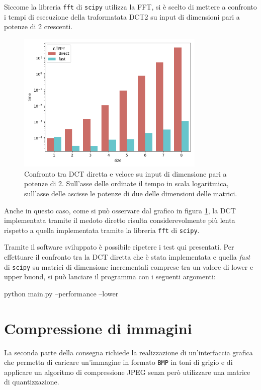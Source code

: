\documentclass[a4paper, 12pt]{article}
\begin{document}
Siccome la libreria \texttt{fft} di \texttt{scipy} utilizza la FFT, si è scelto
di mettere a confronto i tempi di esecuzione della traformatata DCT2 su input di
dimensioni pari a potenze di 2 crescenti.

\begin{figure}[H]
  \centering
  \includegraphics[width=0.8\textwidth]{../test/benchmark-results/bench-order-0.png}
  \caption{Confronto tra DCT diretta e veloce su input di dimensione pari a
    potenze di 2. Sull'asse delle ordinate il tempo in scala logaritmica,
    sull'asse delle ascisse le potenze di due delle dimensioni delle matrici.}
  \label{fig:order-benchmark}
\end{figure}

Anche in questo caso, come si può osservare dal grafico in figura
\ref{fig:order-benchmark}, la DCT implementata tramite il medoto diretto risulta
considerevolmente più lenta rispetto a quella implementata tramite la libreria
\texttt{fft} di \texttt{scipy}.

Tramite il software sviluppato è possibile ripetere i test qui presentati. Per
effettuare il confronto tra la DCT diretta che è stata implementata e quella
\textit{fast} di \texttt{scipy} su matrici di dimensione incrementali comprese
tra un valore di lower e upper buond, si può lanciare il programma con i
seguenti argomenti:
\begin{verbatim*}
  python main.py --performance --lower 
\end{verbatim*}



\section{Compressione di immagini}
La seconda parte della consegna richiede la realizzazione di un'interfaccia
grafica che permetta di caricare un'immagine in formato \texttt{BMP} in toni di
grigio e di applicare un algoritmo di compressione JPEG senza però utilizzare una
matrice di quantizzazione.
\end{document}
